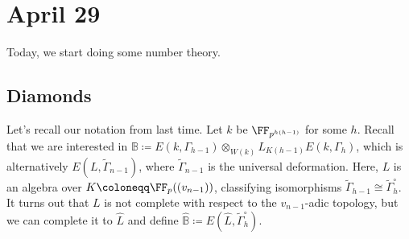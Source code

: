 \documentclass[../notes.tex]{subfiles}
\begin{document}
\section{April 29}
Today, we start doing some number theory.

\subsection{Diamonds}
Let's recall our notation from last time. Let $k$ be $\FF_{p^{h(h-1)}}$ for some $h$. Recall that we are interested in $\mathbb B\coloneqq E(k,\Gamma_{h-1})\otimes_{W(k)}L_{K(h-1)}E(k,\Gamma_h)$, which is alternatively $E(L,\widetilde\Gamma_{n-1})$, where $\widetilde\Gamma_{n-1}$ is the universal deformation. Here, $L$ is an algebra over $K\coloneqq\FF_p((v_{n-1}))$, classifying isomorphisms $\widetilde\Gamma_{h-1}\cong\widetilde\Gamma_h^\circ$. It turns out that $L$ is not complete with respect to the $v_{n-1}$-adic topology, but we can complete it to $\widehat L$ and define $\widehat{\mathbb B}\coloneqq E(\widehat L,\widetilde\Gamma_h^\circ)$.
\end{document}
